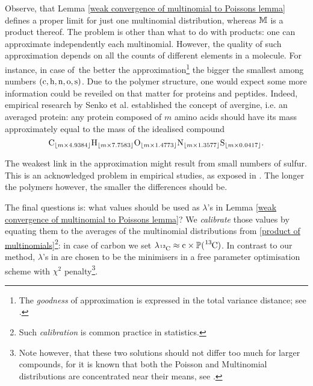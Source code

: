Observe, that Lemma \ref{weak convergence of multinomial to Poissons lemma} defines a proper limit for just one multinomial distribution, whereas $\mathbb{M}$ is a product thereof. The problem is other than what to do with products: one can approximate independently each multinomial. However, the quality of such approximation depends on all the counts of different elements in a molecule. For instance, in case of \molecule\,the better the approximation\footnote{The {\it goodness} of approximation is expressed in the total variance distance; see \cite{Roos1999OnTheRateOfMultivariatePoissonConvergence}.} the bigger the smallest among numbers $(\cem{c}, \cem{h}, \cem{n}, \cem{o}, \cem{s})$. Due to the polymer structure, one would expect some more information could be reveiled on that matter for proteins and peptides. Indeed, empirical research by Senko et al. \cite{Senko1995Determination} established the concept of avergine, i.e. an averaged protein: any protein composed of $m$ amino acids should have its mass approximately equal to the mass of the idealised compound 
\begin{equation*}
	\cem{C}_{\lfloor m \times 4.9384\rfloor} 
	\cem{H}_{\lfloor m \times 7.7583\rfloor} 
	\cem{O}_{\lfloor m \times 1.4773\rfloor} 	
	\cem{N}_{\lfloor m \times 1.3577\rfloor} 
	\cem{S}_{\lfloor m \times 0.0417\rfloor}.
\end{equation*}

The weakest link in the approximation might result from small numbers of sulfur. This is an acknowledged problem in empirical studies, as exposed in \cite{Valkenborg2007UsingPoisson}. The longer the polymers however, the smaller the differences should be. 


The final questions is: what values should be used as $\lambda$'s in Lemma \ref{weak convergence of multinomial to Poissons lemma}? We {\it calibrate} those values by equating them to the averages of the multinomial distributions from \eqref{product of multinomials}\footnote{Such {\it calibration} is common practice in statistics.}: in case of carbon we set $\lambda_\cem{^{13}C} \approx \cem{c} \times \prob( \cem{^{13}C} )$.  In contrast to our method, $\lambda$'s in \cite{Breen2000AutomaticPeak,Valkenborg2007UsingPoisson} are chosen to be the minimisers in a free parameter optimisation scheme with $\chi^2$ penalty\footnote{Note however, that these two solutions should not differ too much for larger compounds, for it is known that both the Poisson and Multinomial distributions are concentrated near their means, see \cite{Bobkov1998OnModifiedLogarithmicSobolev}.}. 


